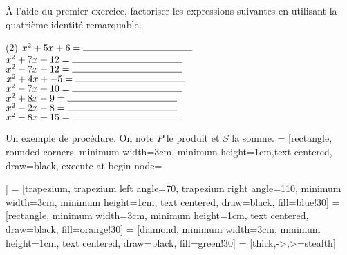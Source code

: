 \documentclass[a4paper,12pt]{report}
\begin{document}
\begin{exo}
	À l'aide du premier exercice, factoriser les expressions suivantes en utilisant la quatrième identité remarquable.
\begin{tasks}(2)
\task $x^2+5x+6=\ligne{4}$ 
\task $x^2+7x+12=\ligne{4}$
\task $x^2-7x+12=\ligne{4}$
\task $x^2+4x+-5=\ligne{4}$
\task $x^2-7x+10=\ligne{4}$
\task $x^2+8x-9=\ligne{4}$
\task $x^2-2x-8=\ligne{4}$
\task $x^2-8x+15=\ligne{4}$
\end{tasks}	
\end{exo}

\afterpage{\bpage}
\newpage

Un exemple de procédure. On note $P$ le produit et $S$ la somme. 
 = [rectangle, rounded corners, minimum width=3cm, minimum height=1cm,text centered, draw=black,
execute at begin node={\begin{varwidth}{15em}},
execute at end node={\end{varwidth}}]
 = [trapezium, trapezium left angle=70, trapezium right angle=110, minimum width=3cm, minimum height=1cm, text centered, draw=black, fill=blue!30]
 = [rectangle, minimum width=3cm, minimum height=1cm, text centered, draw=black, fill=orange!30]
 = [diamond, minimum width=3cm, minimum height=1cm, text centered, draw=black, fill=green!30]
 = [thick,->,>=stealth]
\begin{center}
\end{center}
\end{document}
